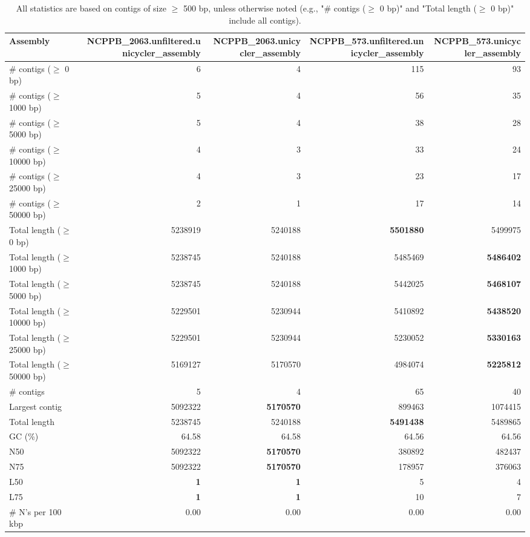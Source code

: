 \documentclass[12pt,a4paper]{article}
\begin{document}
\begin{table}[ht]
\begin{center}
\caption{All statistics are based on contigs of size $\geq$ 500 bp, unless otherwise noted (e.g., "\# contigs ($\geq$ 0 bp)" and "Total length ($\geq$ 0 bp)" include all contigs).}
\begin{tabular}{|l*{4}{|r}|}
\hline
Assembly & NCPPB\_2063.unfiltered.unicycler\_assembly & NCPPB\_2063.unicycler\_assembly & NCPPB\_573.unfiltered.unicycler\_assembly & NCPPB\_573.unicycler\_assembly \\ \hline
\# contigs ($\geq$ 0 bp) & 6 & 4 & 115 & 93 \\ \hline
\# contigs ($\geq$ 1000 bp) & 5 & 4 & 56 & 35 \\ \hline
\# contigs ($\geq$ 5000 bp) & 5 & 4 & 38 & 28 \\ \hline
\# contigs ($\geq$ 10000 bp) & 4 & 3 & 33 & 24 \\ \hline
\# contigs ($\geq$ 25000 bp) & 4 & 3 & 23 & 17 \\ \hline
\# contigs ($\geq$ 50000 bp) & 2 & 1 & 17 & 14 \\ \hline
Total length ($\geq$ 0 bp) & 5238919 & 5240188 & {\bf 5501880} & 5499975 \\ \hline
Total length ($\geq$ 1000 bp) & 5238745 & 5240188 & 5485469 & {\bf 5486402} \\ \hline
Total length ($\geq$ 5000 bp) & 5238745 & 5240188 & 5442025 & {\bf 5468107} \\ \hline
Total length ($\geq$ 10000 bp) & 5229501 & 5230944 & 5410892 & {\bf 5438520} \\ \hline
Total length ($\geq$ 25000 bp) & 5229501 & 5230944 & 5230052 & {\bf 5330163} \\ \hline
Total length ($\geq$ 50000 bp) & 5169127 & 5170570 & 4984074 & {\bf 5225812} \\ \hline
\# contigs & 5 & 4 & 65 & 40 \\ \hline
Largest contig & 5092322 & {\bf 5170570} & 899463 & 1074415 \\ \hline
Total length & 5238745 & 5240188 & {\bf 5491438} & 5489865 \\ \hline
GC (\%) & 64.58 & 64.58 & 64.56 & 64.56 \\ \hline
N50 & 5092322 & {\bf 5170570} & 380892 & 482437 \\ \hline
N75 & 5092322 & {\bf 5170570} & 178957 & 376063 \\ \hline
L50 & {\bf 1} & {\bf 1} & 5 & 4 \\ \hline
L75 & {\bf 1} & {\bf 1} & 10 & 7 \\ \hline
\# N's per 100 kbp & 0.00 & 0.00 & 0.00 & 0.00 \\ \hline
\end{tabular}
\end{center}
\end{table}
\end{document}
